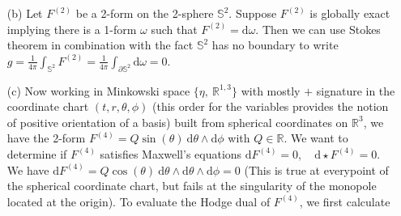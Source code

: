 \documentclass[10pt, a4paper]{article}
\begin{document}
{\begin{enumerate}
  \textbf{Counterexample:} Consider the circle smooth manifold $\mathbb{S}^1 \subset \mathbb{R}^2$ (embeded as $\{x^2 + y^2 = 1|(x, y)\in\mathbb{R}^2\}$ for simplicity). It takes at least two charts to cover this manifold and, although on individual charts all closed 1-forms are exact (charts make the manifold look like $\mathbb{R}$ locally), this property is lost globally. Choose the chart map $\theta = \arctan_2$ sending points $(x, y)$ on the circle to their angle with the $x$ axis excluding the point $(1, 0)$ so that the domain is open. With this chart we have the coordinate induced one form frame field $\text{d}\theta$ which we use to construct the closed form $\omega = \text{d}\theta$. On $(0, 2\pi)$, this form is exact since we have a $0$-form $\lambda =  F \in C^{\infty}((0, 2\pi))$ such that $\omega = \text{d}\lambda = \partial_\theta F \text{d}\theta = \text{d}\theta$ forcing $F = \theta + c$, $c \in \mathbb{R}$ since $F$ has to be a primitive of $1$ in the variable $\theta$. The function $F$ is smooth on the chart, but can never be extended to s smooth function over $\mathbb{S}^1$ globally. Indeed, $0$ and $2\pi$ being identified, a continuous function on $\mathbb{S}^1$ should be consistant at the excluded point $(0, 1)$ and this would requiere  $\lim_{\theta \to 0+} (\theta + c) = \lim_{\theta \to 2\pi^-} (\theta + c)$ which is impossible. Therefore there is a closed form on $\mathbb{S}^1$ that is not exact. 
  \item[(b)] Let $F^{(2)}$ be a 2-form on the 2-sphere $\mathbb{S}^2$. Suppose $F^{(2)}$ is globally exact implying there is a 1-form $\omega$ such that $F^{(2)} = \text{d}\omega$. Then we can use Stokes theorem in combination with the fact $\mathbb{S}^2$ has no boundary to write $g= \frac{1}{4\pi} \int_{\mathbb{S}^2} F^{(2)} = \frac{1}{4\pi} \int_{\partial \mathbb{S}^2} \text{d}\omega = 0$. 
  \item[(c)] Now working in Minkowski space $\{\eta,\ \mathbb{R}^{1, 3}\}$ with mostly $+$ signature in the coordinate chart $(t, r, \theta, \phi)$ (this order for the variables provides the notion of positive orientation of a basis) built from spherical coordinates on $\mathbb{R}^3$, we have the 2-form $F^{(4)} = Q \sin(\theta)\ \text{d}\theta \wedge \text{d}\phi$ with $Q\in \mathbb{R}$. We want to determine if $F^{(4)}$ satisfies Maxwell's equations $\text{d} F^{(4)}=0, \quad \text{d} \star F^{(4)}=0$. We have $\text{d} F^{(4)} =  Q \cos(\theta) \ \text{d}\theta \wedge \text{d}\theta \wedge \text{d}\phi = 0$ (This is true at everypoint of the spherical coordinate chart, but fails at the singularity of the monopole located at the origin). To evaluate the Hodge dual of $F^{(4)}$, we first calculate 

\end{enumerate}}
\end{document}
